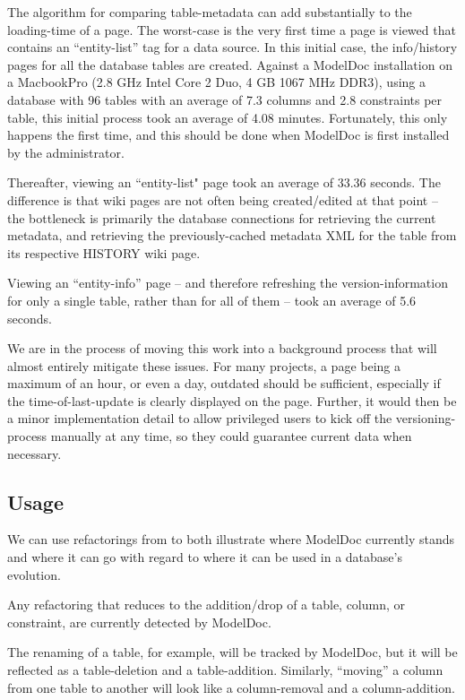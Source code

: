 \documentclass[nocopyrightspace]{acm_proc_article-sp}
\begin{document}
The algorithm for comparing table-metadata can add substantially to the
loading-time of a page.  The worst-case is the very first time a page is viewed
that contains an ``entity-list'' tag for a data source.  In this initial case,
the info/history pages for all the database tables are created.  Against a
ModelDoc installation on a MacbookPro (2.8 GHz Intel Core 2 Duo, 4 GB 1067 MHz
DDR3), using a database with 96 tables with an average of 7.3
columns and 2.8 constraints per table, this initial process took
an average of 4.08 minutes.  Fortunately, this only happens the first time, and
this should be done when ModelDoc is first installed by the administrator.

Thereafter, viewing an ``entity-list" page took an average of 33.36 seconds. The
difference is that wiki pages are not often being created/edited at that point
-- the bottleneck is primarily the database connections for retrieving the
current metadata, and retrieving the previously-cached metadata XML for the
table from its respective HISTORY wiki page.

Viewing an ``entity-info'' page -- and therefore refreshing the
version-information for only a single table, rather than for all of them --
took an average of 5.6 seconds.

We are in the process of moving this work into a background process that will
almost entirely mitigate these issues.  For many projects, a page being a
maximum of an hour, or even a day, outdated should be sufficient, especially if
the time-of-last-update is clearly displayed on the page.  Further, it would
then be a minor implementation detail to allow privileged users to kick off
the versioning-process manually at any time, so they could guarantee current
data when necessary.

\subsection{Usage}

We can use refactorings from \cite{ambler:refactoring} to both illustrate where
ModelDoc currently stands and where it can go with regard to where it can be
used in a database's evolution.

Any refactoring that reduces to the addition/drop of a table, column, or
constraint, are currently detected by ModelDoc.

The renaming of a table, for example, will be tracked by ModelDoc, but it will
be reflected as a table-deletion and a table-addition.  Similarly, ``moving'' a
column from one table to another will look like a column-removal and a
column-addition.
\end{document}
